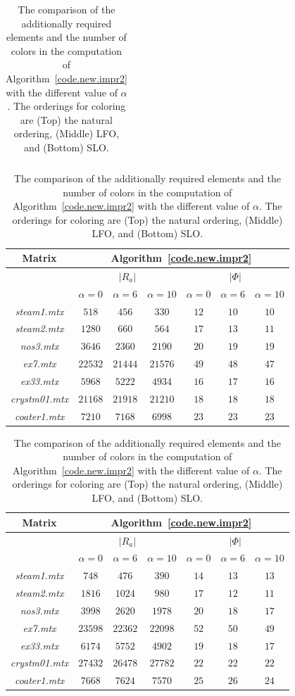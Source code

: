 \documentclass[12pt, twoside,a4paper,toc=bibliography]{scrbook}
\newcommand{\coderef}[1]{Algorithm~\protect\ref{#1}}
\begin{document}
\begin{table}
\begin{tabular}{|c|c|c|c|c|c|c|}
\end{tabular}
\vspace*{1cm}\newline
\begin{tabular}{|c|c|c|c|c|c|c|}
\hline
Matrix & \multicolumn{6}{c|}{\coderef{code.new.impr2}} \\\hline
{} & \multicolumn{3}{c|}{$|R_{a}|$} & \multicolumn{3}{c|}{$|\Phi|$}\\\hline
{} & $\alpha=0$ & $\alpha=6$ & $\alpha=10$ & $\alpha=0$& $\alpha=6$&$\alpha=10$ \\\hline
\textit{steam1.mtx} & $518$ & $456$ & $330$ & $12$ & $10$ & $10$ \\\hline
\textit{steam2.mtx} & $1280$ & $660$ & $564$ & $17$ & $13$ & $11$ \\\hline
\textit{nos3.mtx} & $3646$ & $2360$ & $2190$ & $20$ & $19$ & $19$ \\\hline
\textit{ex7.mtx} & $22532$ & $21444$ & $21576$ & $49$ & $48$ & $47$ \\\hline
\textit{ex33.mtx} & $5968$ & $5222$ & $4934$ & $16$ & $17$ & $16$ \\\hline
\textit{crystm01.mtx} & $21168$ & $21918$ & $21210$ & $18$ & $18$ & $18$ \\\hline
\textit{coater1.mtx} & $7210$ & $7168$ & $6998$ & $23$ & $23$ & $23$ \\\hline
\end{tabular}
\vspace*{1cm}\newline
\begin{tabular}{|c|c|c|c|c|c|c|}
\hline
Matrix & \multicolumn{6}{c|}{\coderef{code.new.impr2}} \\\hline
{} & \multicolumn{3}{c|}{$|R_{a}|$} & \multicolumn{3}{c|}{$|\Phi|$}\\\hline
{} & $\alpha=0$ & $\alpha=6$ & $\alpha=10$ & $\alpha=0$& $\alpha=6$&$\alpha=10$ \\\hline
\textit{steam1.mtx} & $748$ & $476$ & $390$ & $14$ & $13$ & $13$ \\\hline
\textit{steam2.mtx} & $1816$ & $1024$ & $980$ & $17$ & $12$ & $11$ \\\hline
\textit{nos3.mtx} & $3998$ & $2620$ & $1978$ & $20$ & $18$ & $17$ \\\hline
\textit{ex7.mtx} & $23598$ & $22362$ & $22098$ & $52$ & $50$ & $49$ \\\hline
\textit{ex33.mtx} & $6174$ & $5752$ & $4902$ & $19$ & $18$ & $17$ \\\hline
\textit{crystm01.mtx} & $27432$ & $26478$ & $27782$ & $22$ & $22$ & $22$ \\\hline
\textit{coater1.mtx} & $7668$ & $7624$ & $7570$ & $25$ & $26$ & $24$ \\\hline
\end{tabular}
\caption{
The comparison of the additionally required elements and the number of colors 
in the computation of \coderef{code.new.impr2} with the different value of $\alpha$.
The orderings for coloring are (Top) the natural ordering,
(Middle) LFO, and (Bottom) SLO.}
\label{different.alpha}
\end{table}
\end{document}
